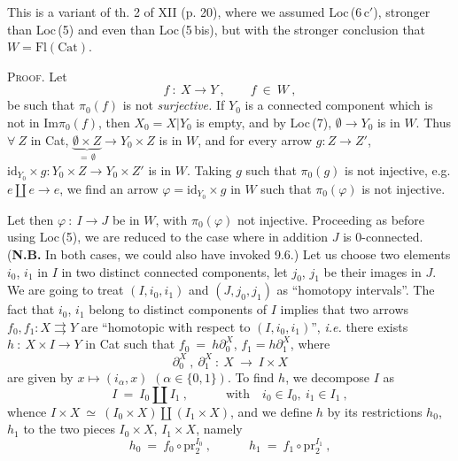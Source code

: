 \documentclass[11pt]{article}
\newcommand{\msp}[1]{\marginpar{\footnotesize [#1]}}
\newcommand{\Cat}{\mathrm{Cat}}
\newcommand{\id}{\mathrm{id}}
\newcommand{\Fl}{\mathrm{Fl}}
\begin{document}
This is a variant of th. 2 of XII (p. 20), where we assumed Loc\,(6\,c$'$), stronger than Loc\,(5) and even than Loc\,(5\,bis), but with the stronger conclusion that $W=\Fl(\Cat)$.

\textsc{Proof}. Let
\[
f\ :\ X\longrightarrow Y\ ,\qquad f\ \in\ W\ ,
\]
be such that $\pi_0(f)$ is not \textit{surjective.} If $Y_0$ is a connected component which is not in $\mathrm{Im}\pi_0(f)$, then $X_0=X|Y_0$ is empty, and by Loc\,(7), $\emptyset\longrightarrow Y_0$ is in $W$. Thus $\forall\ Z$ in Cat, %
$\underbrace{\emptyset\times Z}_{=\,\emptyset}\longrightarrow Y_0\times Z$ is in $W$, and for every arrow $g : Z\longrightarrow Z'$, $\id_{Y_0}\times g : Y_0\times Z\longrightarrow Y_0\times Z'$ is in $W$. Taking $g$ such that $\pi_0(g)$ is not injective, e.g. $e\amalg e\longrightarrow e$, we find an arrow $\varphi=\id_{Y_0}\times g$ in $W$ such that $\pi_0(\varphi)$ is not injective.

\msp{page 127}

Let then $\varphi\ :\ I\longrightarrow J$ be in $W$, with $\pi_0(\varphi)$ not injective. Proceeding as before using Loc\,(5), we are reduced to the case where in addition $J$ is $0$-connected. (\textbf{N.B.} In both cases, we could also have invoked 9.6.) Let us choose two elements $i_0$, $i_1$ in $I$ in two distinct connected components, let $j_0$, $j_1$ be their images in $J$. We are going to treat $(I,i_0,i_1)$ and $(J,j_0,j_1)$ as ``homotopy intervals''. The fact that $i_0$, $i_1$ belong to distinct components of $I$ implies that two arrows $f_0,f_1 : X\rightrightarrows Y$ are ``homotopic with respect to $(I,i_0,i_1)$'', \textit{i.e.} there exists $h\ :\ X\times I\longrightarrow Y$ in Cat such that $f_0\ =\ h\partial_0^X$, $f_1=h\partial_1^X$, where
\[
\partial_0^X\ ,\ \partial_1^X\ :\ X\ \longrightarrow\ I\times X
\]
are given by $x\longmapsto(i_\alpha,x)$ $(\alpha\in\{0,1\})$. To find $h$, we decompose $I$ as
\[
I\ =\ I_0\amalg I_1\ ,\qquad\quad \text{with}\quad i_0\in I_0,\ i_1\in I_1\ ,
\]
whence $I\times X\ \simeq\ (I_0\times X)\amalg(I_1\times X)$, and we define $h$ by its restrictions $h_0$, $h_1$ to the two pieces $I_0\times X$, $I_1\times X$, namely
\[
h_0\ =\ f_0\circ\mathrm{pr}_2^{I_0}\ ,\qquad\quad h_1\ =\ f_1\circ\mathrm{pr}_2^{I_1}\ ,
\]
\end{document}
